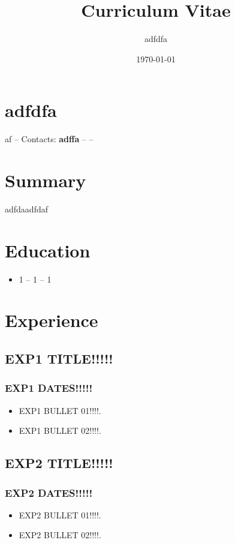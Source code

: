 \documentclass[a4paper, 9pt]{article}
\title{Curriculum Vitae}
\author{adfdfa}
\date{\today}
\begin{document}
\section*{adfdfa}

\small af -- Contacts: \textbf{adffa} --  --


\section*{Summary}
adfdaadfdaf


\section*{Education}
\begin{itemize}[noitemsep]
\item 1 -- 1 -- 1
\end{itemize}


\section*{Experience}

\subsection*{EXP1 TITLE!!!!!}
\subsubsection*{EXP1 DATES!!!!!}

\begin{itemize}[noitemsep]

\item EXP1 BULLET 01!!!!.
\item EXP1 BULLET 02!!!!.
\end{itemize}

\subsection*{EXP2 TITLE!!!!!}
\subsubsection*{EXP2 DATES!!!!!}
\begin{itemize}[noitemsep]
\item EXP2 BULLET 01!!!!.
\item EXP2 BULLET 02!!!!.
\end{itemize}
\end{document}
